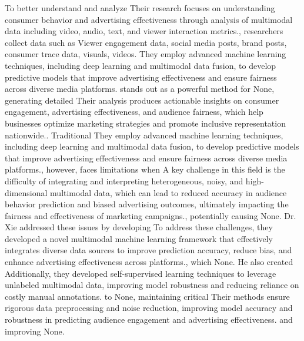 \documentclass{article}
\begin{document}
To better understand and analyze Their research focuses on understanding consumer behavior and advertising effectiveness through analysis of multimodal data including video, audio, text, and viewer interaction metrics., researchers collect data such as Viewer engagement data, social media posts, brand posts, consumer trace data, visuals, videos. They employ advanced machine learning techniques, including deep learning and multimodal data fusion, to develop predictive models that improve advertising effectiveness and ensure fairness across diverse media platforms. stands out as a powerful method for None, generating detailed Their analysis produces actionable insights on consumer engagement, advertising effectiveness, and audience fairness, which help businesses optimize marketing strategies and promote inclusive representation nationwide.. Traditional They employ advanced machine learning techniques, including deep learning and multimodal data fusion, to develop predictive models that improve advertising effectiveness and ensure fairness across diverse media platforms., however, faces limitations when A key challenge in this field is the difficulty of integrating and interpreting heterogeneous, noisy, and high-dimensional multimodal data, which can lead to reduced accuracy in audience behavior prediction and biased advertising outcomes, ultimately impacting the fairness and effectiveness of marketing campaigns., potentially causing None. Dr. Xie addressed these issues by developing To address these challenges, they developed a novel multimodal machine learning framework that effectively integrates diverse data sources to improve prediction accuracy, reduce bias, and enhance advertising effectiveness across platforms., which None. He also created Additionally, they developed self-supervised learning techniques to leverage unlabeled multimodal data, improving model robustness and reducing reliance on costly manual annotations. to None, maintaining critical Their methods ensure rigorous data preprocessing and noise reduction, improving model accuracy and robustness in predicting audience engagement and advertising effectiveness. and improving None.
\end{document}

